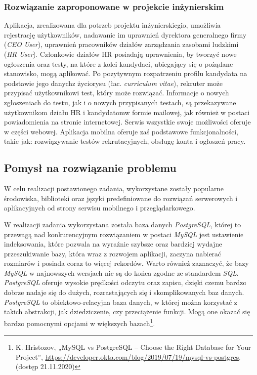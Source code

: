 \documentclass[twoside]{projektInzynierskiMS}
\numberwithin{figure}{section}
\begin{document}
\subsubsection{Rozwiązanie zaproponowane w projekcie inżynierskim}
Aplikacja, zrealizowana dla potrzeb projektu inżynierskiegio, umożliwia rejestrację użytkowników, nadawanie im uprawnień dyrektora generalnego firmy (\textit{CEO User}), uprawnień pracowników działów zarządzania zasobami ludzkimi (\textit{HR User}). Członkowie działów HR posiadają uprawnienia, by tworzyć nowe ogłoszenia oraz testy, na które z kolei kandydaci, ubiegający się o pożądane stanowisko, mogą aplikować. Po pozytywnym rozpatrzeniu profilu kandydata na podstawie jego danych\linebreak z życiorysu (łac. \textit{curriculum vitae}), rekruter może przypisać użytkownikowi test, który może rozwiązać. Informacje o nowych zgłoszeniach do testu, jak i o nowych przypisanych testach, są przekazywane użytkownikom działu HR i kandydatom\linebreak w formie mailowej, jak również w postaci powiadomienia na stronie internetowej. Serwis wszystkie swoje możliwości oferuje w części webowej. Aplikacja mobilna oferuje zaś podstawowe funkcjonalności, takie jak: rozwiązywanie testów rekrutacyjnych, obsługę konta i ogłoszeń pracy.

\subsection{Pomysł na rozwiązanie problemu}
W celu realizacji postawionego zadania, wykorzystane zostały popularne środowiska, biblioteki oraz języki predefiniowane do rozwiązań serwerowych i aplikacyjnych od strony serwisu mobilnego i przeglądarkowego.

W realizacji zadania wykorzystana została baza danych \textit{PostgreSQL}, której to przewagą nad konkurencyjnym rozwiązaniem w postaci \textit{MySQL} jest ustawienie indeksowania, które pozwala na wyraźnie szybsze oraz bardziej wydajne przeszukiwanie bazy, która wraz z rozwojem aplikacji, zaczyna nabierać rozmiarów i posiada coraz to więcej rekordów. Warto również zaznaczyć, że bazy \textit{MySQL} w najnowszych wersjach nie są do końca zgodne ze standardem \textit{SQL}. \textit{PostgreSQL} oferuje wysokie prędkości odczytu oraz zapisu, dzięki czemu bardzo dobrze nadaje się do dużych, rozrastających się i skomplikowanych baz danych. \textit{PostgreSQL} to obiektowo-relacyjna baza danych, w której można korzystać z takich abstrakcji, jak dziedziczenie, czy przeciążenie funkcji. Mogą one okazać się bardzo pomocnymi opcjami w większych bazach\footnote{K. Hristozov, „MySQL vs PostgreSQL -- Choose the Right Database for Your Project”, \newline \url{https://developer.okta.com/blog/2019/07/19/mysql-vs-postgres}, (dostęp 21.11.2020)}.
\end{document}
